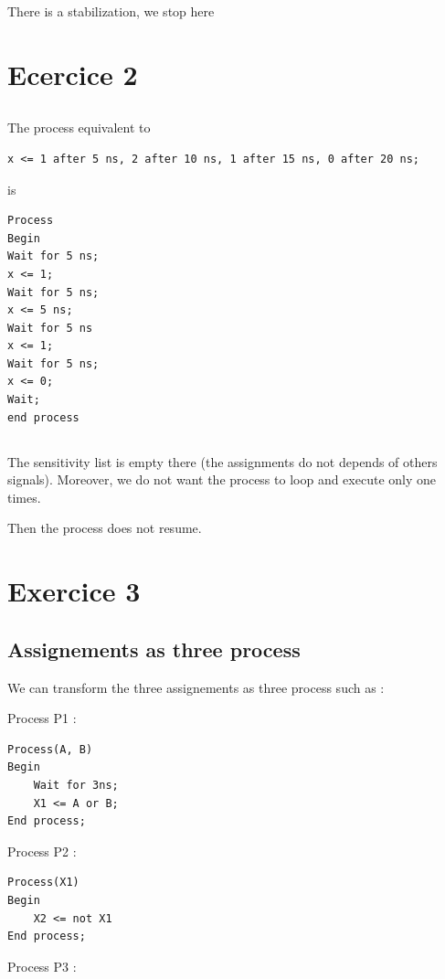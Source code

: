 \documentclass{article}
\begin{document}
There is a stabilization, we stop here


\section{Ecercice 2}
\subsection{}
The process equivalent to 
\begin{verbatim}
x <= 1 after 5 ns, 2 after 10 ns, 1 after 15 ns, 0 after 20 ns;
\end{verbatim}
is
 
\begin{verbatim}
Process
Begin
Wait for 5 ns;
x <= 1;
Wait for 5 ns;
x <= 5 ns;
Wait for 5 ns 
x <= 1;
Wait for 5 ns;
x <= 0;
Wait;
end process
\end{verbatim}

\subsection{}

The sensitivity list is empty there (the assignments do not depends of others signals). Moreover, we do not want the process to loop and execute only one times. 

Then the process does not resume.

\section{Exercice 3}

\subsection{Assignements as three process}

We can transform the three assignements as three process such as :

Process P1 :

\begin{verbatim}
Process(A, B)
Begin
	Wait for 3ns;
	X1 <= A or B;
End process;
\end{verbatim}

Process P2 : 

\begin{verbatim}
Process(X1)
Begin
	X2 <= not X1
End process;
\end{verbatim}

Process P3 :
\end{document}
